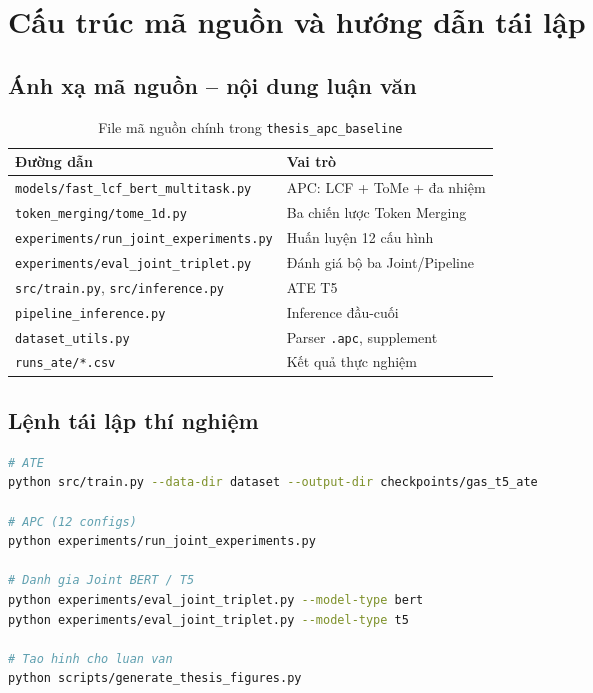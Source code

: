 \chapter{Cấu trúc mã nguồn và hướng dẫn tái lập}
\label{app:code}

\section{Ánh xạ mã nguồn -- nội dung luận văn}

\begin{table}[H]
\centering
\caption{File mã nguồn chính trong \texttt{thesis\_apc\_baseline}}
\label{tab:app_files}
\small
\begin{tabular}{@{}ll@{}}
\toprule
\textbf{Đường dẫn} & \textbf{Vai trò} \\
\midrule
\texttt{models/fast\_lcf\_bert\_multitask.py} & APC: LCF + ToMe + đa nhiệm \\
\texttt{token\_merging/tome\_1d.py} & Ba chiến lược Token Merging \\
\texttt{experiments/run\_joint\_experiments.py} & Huấn luyện 12 cấu hình \\
\texttt{experiments/eval\_joint\_triplet.py} & Đánh giá bộ ba Joint/Pipeline \\
\texttt{src/train.py}, \texttt{src/inference.py} & ATE T5 \\
\texttt{pipeline\_inference.py} & Inference đầu-cuối \\
\texttt{dataset\_utils.py} & Parser \texttt{.apc}, supplement \\
\texttt{runs\_ate/*.csv} & Kết quả thực nghiệm \\
\bottomrule
\end{tabular}
\end{table}

\section{Lệnh tái lập thí nghiệm}

\begin{lstlisting}[language=bash,caption={Huấn luyện và đánh giá}]
# ATE
python src/train.py --data-dir dataset --output-dir checkpoints/gas_t5_ate

# APC (12 configs)
python experiments/run_joint_experiments.py

# Danh gia Joint BERT / T5
python experiments/eval_joint_triplet.py --model-type bert
python experiments/eval_joint_triplet.py --model-type t5

# Tao hinh cho luan van
python scripts/generate_thesis_figures.py
\end{lstlisting}

